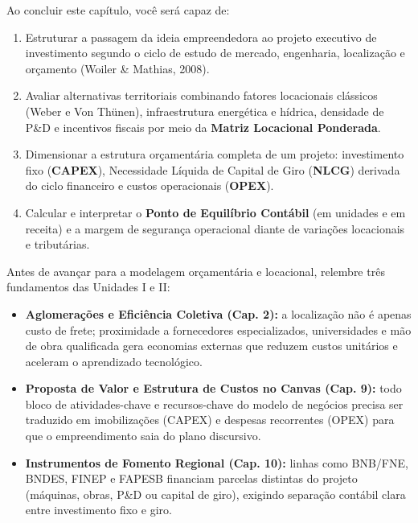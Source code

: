 \begin{capObjetivos}
Ao concluir este capítulo, você será capaz de:
\begin{enumerate}[leftmargin=1.4em, itemsep=2pt]
  \item Estruturar a passagem da ideia empreendedora ao projeto executivo de investimento segundo o ciclo de estudo de mercado, engenharia, localização e orçamento (Woiler \& Mathias, 2008).
  \item Avaliar alternativas territoriais combinando fatores locacionais clássicos (Weber e Von Thünen), infraestrutura energética e hídrica, densidade de P\&D e incentivos fiscais por meio da \textbf{Matriz Locacional Ponderada}.
  \item Dimensionar a estrutura orçamentária completa de um projeto: investimento fixo (\textbf{CAPEX}), Necessidade Líquida de Capital de Giro (\textbf{NLCG}) derivada do ciclo financeiro e custos operacionais (\textbf{OPEX}).
  \item Calcular e interpretar o \textbf{Ponto de Equilíbrio Contábil} (em unidades e em receita) e a margem de segurança operacional diante de variações locacionais e tributárias.
\end{enumerate}
\end{capObjetivos}

\begin{capRevisao}
Antes de avançar para a modelagem orçamentária e locacional, relembre três fundamentos das Unidades I e II:
\begin{itemize}[leftmargin=1.4em, itemsep=2pt]
  \item \textbf{Aglomerações e Eficiência Coletiva (Cap. 2):} a localização não é apenas custo de frete; proximidade a fornecedores especializados, universidades e mão de obra qualificada gera economias externas que reduzem custos unitários e aceleram o aprendizado tecnológico.
  \item \textbf{Proposta de Valor e Estrutura de Custos no Canvas (Cap. 9):} todo bloco de atividades-chave e recursos-chave do modelo de negócios precisa ser traduzido em imobilizações (CAPEX) e despesas recorrentes (OPEX) para que o empreendimento saia do plano discursivo.
  \item \textbf{Instrumentos de Fomento Regional (Cap. 10):} linhas como BNB/FNE, BNDES, FINEP e FAPESB financiam parcelas distintas do projeto (máquinas, obras, P\&D ou capital de giro), exigindo separação contábil clara entre investimento fixo e giro.
\end{itemize}
\end{capRevisao}

